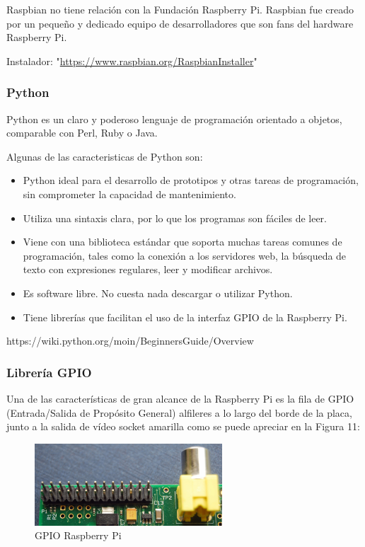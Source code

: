 \documentclass[11pt,letterpaper]{article}
\begin{document}
Raspbian no tiene relación con la Fundación Raspberry Pi. Raspbian fue creado por un pequeño y dedicado equipo de desarrolladores que son fans del hardware Raspberry Pi.

Instalador: "\url{https://www.raspbian.org/RaspbianInstaller}"

\subsubsection{Python}

Python es un claro  y poderoso lenguaje de programación orientado a objetos, comparable con Perl, Ruby o Java.

Algunas de las caracteristicas de Python son:

\begin{itemize}
\item Python ideal para el desarrollo de prototipos y otras tareas de programación, sin comprometer la capacidad de mantenimiento.
\item Utiliza una sintaxis clara, por lo que los programas son fáciles de leer.
\item Viene con una biblioteca estándar que soporta muchas tareas comunes de programación, tales como la conexión a los servidores web, la búsqueda de texto con expresiones regulares, leer y modificar archivos.
\item Es software libre. No cuesta nada descargar o utilizar Python.
\item Tiene librerías que facilitan el uso de la interfaz GPIO de la Raspberry Pi.
\end{itemize}

https://wiki.python.org/moin/BeginnersGuide/Overview

\subsubsection{Librería GPIO}

Una de las características de gran alcance de la Raspberry Pi es la fila de GPIO\citep{gpio} (Entrada/Salida de Propósito General) alfileres a lo largo del borde de la placa, junto a la salida de vídeo socket amarilla como se puede apreciar en la Figura 11:

\begin{figure}[ht!]
\caption{GPIO Raspberry Pi}
\centering
\includegraphics[width=7cm]{gpio}
\end{figure}
\end{document}
